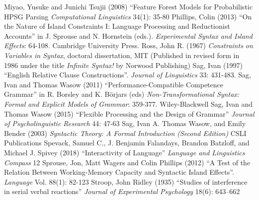 \documentclass[a4paper]{article}
\begin{document}
Miyao, Yusuke  and Junichi Tsujii (2008) ``Feature Forest Models for
Probabilistic HPSG Parsing  {\it Computational Linguistics} 34(1): 35-80
\newline
\newline
Phillips, Colin (2013) ``On the Nature of Island Constraints I: Language Processing and Reductionist Accounts'' in
J. Sprouse and N. Hornstein (eds.).
{\it Experimental Syntax
and Island Effects}: 64-108.
Cambridge University
Press.
\newline
\newline
Ross, John R. (1967) {\it Constraints on Variables in Syntax}, doctoral dissertation, MIT  (Published in revised form in 1986 under the title {\it Infinite Syntax!} by Norwood Publishing)
\newline
\newline
Sag, Ivan (1997) ``English Relative Clause Constructions''.  {\it Journal of
Linguistics}
33:  
431-483.
\newline
\newline
Sag, Ivan and Thomas Wasow (2011) ``Performance-Compatible Competence Grammar'' in R. Borsley and K. Börjars (eds) {\it Non-Transformational Syntax: Formal and Explicit Models of Grammar}: 359-377. Wiley-Blackwell
\newline
\newline
Sag, Ivan and Thomas Wasow (2015) ``Flexible Processing and the Design of Grammar'' {\it Journal of Psycholinguistic Research} 44: 47-63
\newline
\newline
Sag, Ivan A. Thomas Wasow, and Emily Bender (2003) {\it Syntactic Theory: A Formal Introduction (Second Edition)} CSLI Publications
\newline
\newline
Spevack, Samuel C., 
J. Benjamin Falandays,
Brandon Batzloff, and
Michael J. Spivey (2018) ``Interactivity of Language'' {\it Language and Linguistics Compass} 12
\newline
\newline
Sprouse, Jon, Matt Wagers and Colin Phillips (2012) ``A Test of the Relation Between Working-Memory Capacity and Syntactic Island Effects''.  {\it Language}  Vol. 88(1): 82-123
\newline
\newline
Stroop, John Ridley (1935) ``Studies of interference in serial verbal reactions'' {\it Journal of Experimental Psychology} 18(6): 643–662
\end{document}

